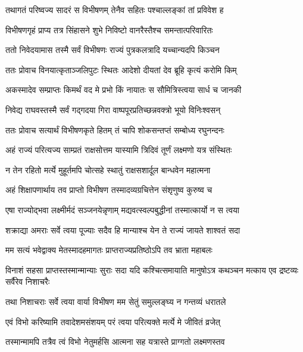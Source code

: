 \twolineshloka
{तथागतं परिष्वज्य सादरं स विभीषणम्}
{तेनैव सहितः पश्चाल्लङ्कां तां प्रविवेश ह}%

\twolineshloka
{विभीषणगृहं प्राप्य तत्र सिंहासने शुभे}
{निविष्टो वानरैस्तैश्च समन्तात्परिवारितः}%

\twolineshloka
{ततो निवेदयामास तस्मै सर्वं विभीषणः}
{राज्यं पुत्रकलत्रादि यच्चान्यदपि किञ्चन}%

\twolineshloka
{ततः प्रोवाच विनयात्कृताञ्जलिपुटः स्थितः}
{आदेशो दीयतां देव ब्रूहि कृत्यं करोमि किम्}%

\twolineshloka
{अकस्मादेव सम्प्राप्तः किमर्थं वद मे प्रभो}
{किं नायातः स सौमित्रिस्त्वया सार्ध च जानकी}%


\twolineshloka
{निवेद्य राघवस्तस्मै सर्वं गद्गदया गिरा}
{वाष्पपूरप्रतिच्छन्नवक्त्रो भूयो विनिःश्वसन्}%

\twolineshloka
{ततः प्रोवाच सत्यार्थं विभीषणकृते हितम्}
{तं चापि शोकसन्तप्तं सम्बोध्य रघुनन्दनः}%

\twolineshloka
{अहं राज्यं परित्यज्य साम्प्रतं राक्षसोत्तम}
{यास्यामि त्रिदिवं तूर्णं लक्ष्मणो यत्र संस्थितः}%

\twolineshloka
{न तेन रहितो मर्त्ये मुहूर्तमपि चोत्सहे}
{स्थातुं राक्षसशार्दूल बान्धवेन महात्मना}%

\twolineshloka
{अहं शिक्षापणार्थाय तव प्राप्तो विभीषण}
{तस्मादव्यग्रचित्तेन संशृणुष्व कुरुष्व च}%

\twolineshloka
{एषा राज्योद्भवा लक्ष्मीर्मदं सञ्जनयेन्नृणाम्}
{मद्यवत्स्वल्पबुद्धीनां तस्मात्कार्यो न स त्वया}%

\twolineshloka
{शक्राद्या अमराः सर्वे त्वया पूज्याः सदैव हि}
{मान्याश्च येन ते राज्यं जायते शाश्वतं सदा}%

\twolineshloka
{मम सत्यं भवेद्वाक्य मेतस्मादहमागतः}
{प्राप्तराज्यप्रतिष्ठोऽपि तव भ्राता महाबलः}%

\threelineshloka
{विनाशं सहसा प्राप्तस्तस्मान्मान्याः सुराः सदा}
{यदि कश्चित्समायाति मानुषोऽत्र कथञ्चन}
{मत्काय एव द्रष्टव्यः सर्वैरेव निशाचरैः}%

\twolineshloka
{तथा निशाचराः सर्वे त्वया वार्या विभीषण}
{मम सेतुं समुल्लङ्घ्य न गन्तव्यं धरातले}%


\twolineshloka
{एवं विभो करिष्यामि तवादेशमसंशयम्}
{परं त्वया परित्यक्ते मर्त्ये मे जीवितं व्रजेत्}%

\twolineshloka
{तस्मान्मामपि तत्रैव त्वं विभो नेतुमर्हसि}
{आत्मना सह यत्रास्ते प्राग्गतो लक्ष्मणस्तव}%


